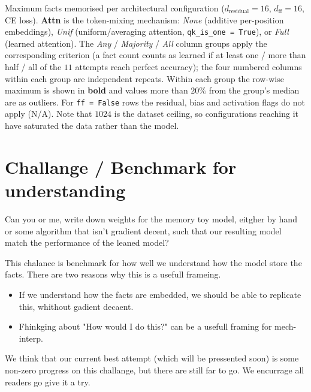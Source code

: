 \documentclass[11pt,a4paper]{article}
\begin{document}
\begin{table}[h]
\footnotesize
\setlength{\tabcolsep}{4.5pt}
\renewcommand{\arraystretch}{0.82}
\setlength{\fboxsep}{1.5pt}  %
\begin{adjustwidth}{-2cm}{-1.2cm}
\centering

\end{adjustwidth}
\caption{Maximum facts memorised per architectural configuration ($d_\text{residual}=16$, $d_\text{ff}=16$, CE loss). \textbf{Attn} is the token-mixing mechanism: \emph{None} (additive per-position embeddings), \emph{Unif} (uniform/averaging attention, \texttt{qk\_is\_one = True}), or \emph{Full} (learned attention). The \emph{Any} / \emph{Majority} / \emph{All} column groups apply the corresponding criterion (a fact count counts as learned if at least one / more than half / all of the $11$ attempts reach perfect accuracy); the four numbered columns within each group are independent repeats. Within each group the row-wise maximum is shown in \textbf{bold} and values more than $20\%$ from the group's median are  as outliers. For \texttt{ff = False} rows the residual, bias and activation flags do not apply (N/A). Note that $1024$ is the dataset ceiling, so configurations reaching it have saturated the data rather than the model.}
\label{tab:e5}
\end{table}


\section{Challange / Benchmark for understanding}
Can you or me, write down weights for the memory toy model, eitgher by hand or some algorithm that isn't gradient decent, such that our resulting model match the performance of the leaned model?

This chalance is benchmark for how well we understand how the model store the facts. There are two reasons why this is a usefull frameing.
\begin{itemize}
    \item If we understand how the facts are embedded, we should be able to replicate this, whithout gadient decaent.
    \item Fhinkging about "How would I do this?" can be a usefull framing for mech-interp.
\end{itemize}

We think that our current best attempt (which will be pressented soon) is some non-zero progress on this challange, but there are still far to go. We encurrage all readers go give it a try.
\end{document}
